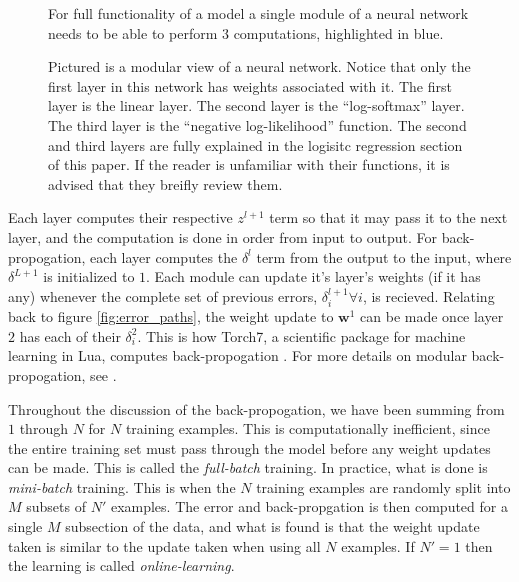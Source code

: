 \documentclass[11pt]{article}
\begin{document}
\begin{minipage}{0.37\linewidth}
  \begin{figure}[H]
    \centering
    
    \caption{For full functionality of a model a single module of a neural network needs to be able to perform $3$ computations, highlighted in blue.}
    \label{fig:single_module}
  \end{figure}
\end{minipage}\hfill
\begin{minipage}{0.57\linewidth}
  \begin{figure}[H]
    \centering
    
    \caption{Pictured is a modular view of a neural network. Notice that only the first layer in this network has weights associated with it. The first layer is the linear layer. The second layer is the ``log-softmax'' layer. The third layer is the ``negative log-likelihood'' function. The second and third layers are fully explained in the logisitc regression section of this paper. If the reader is unfamiliar with their functions, it is advised that they breifly review them.}
    \label{fig:module_nn}
  \end{figure}
\end{minipage}
\vspace{1cm}

Each layer computes their respective $z^{l+1}$ term so that it may pass it to the next layer, and the computation is done in order from input to output. For back-propogation, each layer computes the $\delta^{l}$ term from the output to the input, where $\delta^{L+1}$ is initialized to $1$. Each module can update it's layer's weights (if it has any) whenever the complete set of previous errors, $\delta_{i}^{l+1} \forall i$, is recieved. Relating back to figure \ref{fig:error_paths}, the weight update to $\mathbf{w}^{1}$ can be made once layer $2$ has each of their $\delta_{i}^{2}$. This is how Torch7, a scientific package for machine learning in Lua, computes back-propogation \cite{torch}. For more details on modular back-propogation, see \cite{Freitas}.

Throughout the discussion of the back-propogation, we have been summing from $1$ through $N$ for $N$ training examples. This is computationally inefficient, since the entire training set must pass through the model before any weight updates can be made. This is called the \emph{full-batch} training. In practice, what is done is \emph{mini-batch} training. This is when the $N$ training examples are randomly split into $M$ subsets of $N'$ examples. The error and back-propgation is then computed for a single $M$ subsection of the data, and what is found is that the weight update taken is similar to the update taken when using all $N$ examples. If $N' = 1$ then the learning is called \emph{online-learning}.
\end{document}
